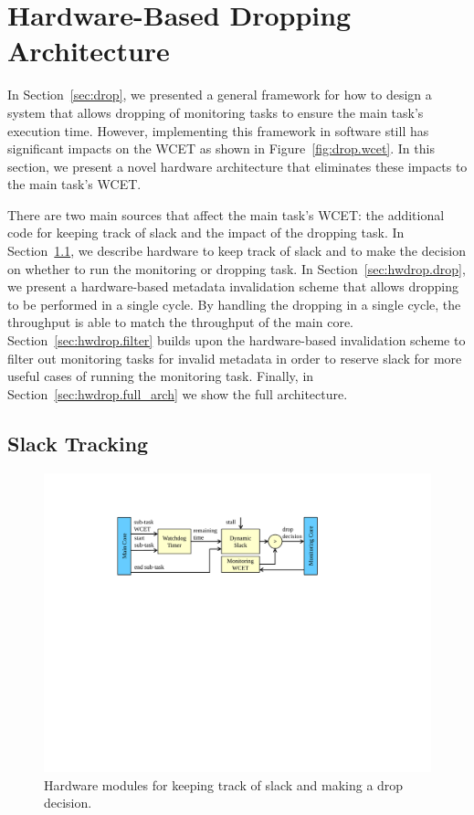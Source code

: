 \section{Hardware-Based Dropping Architecture}
\label{sec:hwdrop}

In Section~\ref{sec:drop}, we presented a general framework for how to design a
system that allows dropping of monitoring tasks to ensure the main task's
execution time. However, implementing this framework in software still has
significant impacts on the WCET as shown in Figure~\ref{fig:drop.wcet}.  In
this section, we present a novel hardware architecture that eliminates these
impacts to the main task's WCET.

There are two main sources that affect the main task's WCET: the additional
code for keeping track of slack and the impact of the dropping task.  In
Section~\ref{sec:hwdrop.slack}, we describe hardware to keep track of slack and
to make the decision on whether to run the monitoring or dropping task.  In
Section~\ref{sec:hwdrop.drop}, we present a hardware-based metadata
invalidation scheme that allows dropping to be performed in a single cycle.  By
handling the dropping in a single cycle, the throughput is able to match the
throughput of the main core.  Section~\ref{sec:hwdrop.filter} builds upon the
hardware-based invalidation scheme to filter out monitoring tasks for invalid
metadata in order to reserve slack for more useful cases of running the
monitoring task. Finally, in Section~\ref{sec:hwdrop.full_arch} we show the
full architecture.

\subsection{Slack Tracking}
\label{sec:hwdrop.slack}

\begin{figure}
  \begin{center}
    \includegraphics[width=\columnwidth]{monitoring_hard_drop/figs/slack_tracking.pdf}
    \caption{Hardware modules for keeping track of slack and making a drop decision.}
    \label{fig:hwdrop.slack_tracking} 
  \end{center}
\end{figure}

